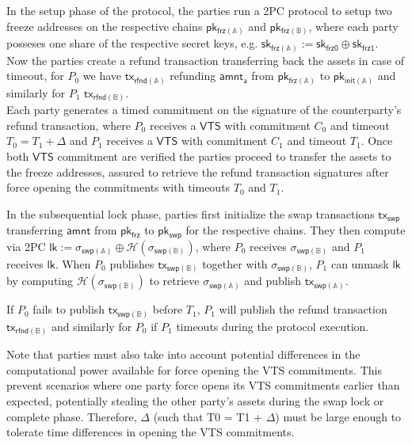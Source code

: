 \documentclass{article}      	%
\begin{document}
In the setup phase of the protocol, the parties run a 2PC protocol to setup two freeze addresses on the respective chains $\mathsf{pk_{frz(\mathbb{A})}}$ and $\mathsf{pk_{frz(\mathbb{B})}}$, where each party posseses one share of the respective secret keys, e.g. $\mathsf{sk_{frz(\mathbb{A})}} := \mathsf{sk_{frz0}} \oplus  \mathsf{sk_{frz1}}$. \\
Now the parties create a refund transaction transferring back the assets in case of timeout, for $P_0$ we have $\mathsf{tx_{rfnd(\mathbb{A})}}$ refunding $\mathsf{amnt_a}$ from $\mathsf{pk_{frz(\mathbb{A})}}$ to $\mathsf{pk_{init(\mathbb{A})}}$ and similarly for $P_1$ $\mathsf{tx_{rfnd(\mathbb{B})}}$. \\
Each party generates a timed commitment on the signature of the counterparty's refund transaction, where $P_0$ receives a $\mathsf{VTS}$ with commitment $C_0$ and timeout $T_0 = T_1 + \Delta$ and $P_1$ receives a $\mathsf{VTS}$ with commitment $C_1$ and timeout $T_1$. Once both $\mathsf{VTS}$ commitment are verified the parties proceed to transfer the assets to the freeze addresses, assured to retrieve the refund transaction signatures after force opening the commitments with timeouts $T_0$ and $T_1$.

In the subsequential lock phase, parties first initialize the swap transactions $\mathsf{tx_{swp}}$ transferring $\mathsf{amnt}$ from $\mathsf{pk_{frz}}$ to $\mathsf{pk_{swp}}$ for the respective chains. They then compute via 2PC $\mathsf{lk} := \sigma_{\mathsf{swp}(\mathbb{A})} \oplus \mathcal{H}(\sigma_{\mathsf{swp}(\mathbb{B})})$, where  $P_0$ receives $\sigma_{\mathsf{swp}(\mathbb{B})}$ and $P_1$ receives $\mathsf{lk}$.  When $P_0$ publishes $\mathsf{tx_{swp(\mathbb{B})}}$ together with  $\sigma_{\mathsf{swp}(\mathbb{B})}$, $P_1$ can unmask $\mathsf{lk}$ by computing $\mathcal{H}(\sigma_{\mathsf{swp}(\mathbb{B})})$ to retrieve $\sigma_{\mathsf{swp}(\mathbb{A})}$ and publish $\mathsf{tx_{swp(\mathbb{A})}}$.

 If $P_0$ fails to publish $\mathsf{tx_{swp(\mathbb{B})}}$ before $T_1$, $P_1$ will publish the refund transaction $\mathsf{tx_{rfnd(\mathbb{B})}}$ and similarly for $P_0$ if $P_1$ timeouts during the protocol execution.

Note that parties must also take into account potential differences in the computational power available for force opening the VTS commitments. This prevent scenarios where one party force opens its VTS commitments earlier than expected, potentially stealing 
 the other party's assets during the swap lock or complete phase. Therefore,  $\Delta$ (such that T0 = T1 + $\Delta$) must be large enough to tolerate time differences in opening the VTS commitments. \\
\end{document}
